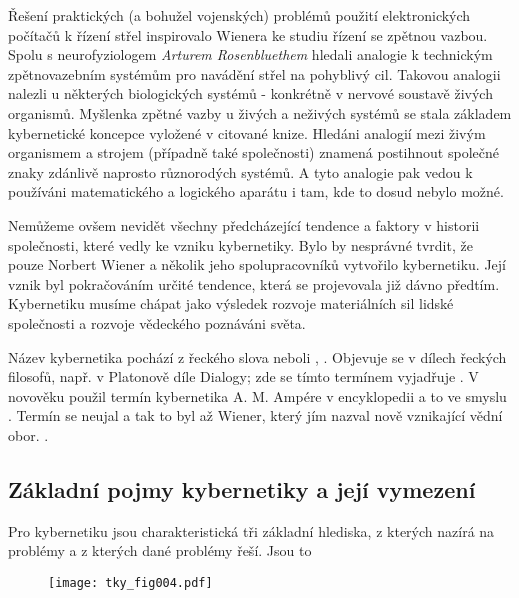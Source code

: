     Řešení praktických (a bohužel vojenských) problémů použití elektronických počítačů k řízení 
    střel inspirovalo Wienera ke studiu řízení se zpětnou vazbou. Spolu s neurofyziologem 
    \emph{Arturem Rosenbluethem} hledali analogie k technickým zpětnovazebním systémům pro navádění 
    střel na pohyblivý cil. Takovou analogii nalezli u některých biologických systémů - konkrétně v 
    nervové soustavě živých organismů. Myšlenka zpětné vazby u živých a neživých systémů se stala 
    základem kybernetické koncepce vyložené v citované knize. Hledáni analogií mezi živým 
    organismem a strojem (případně také společnosti) znamená postihnout společné znaky zdánlivě 
    naprosto různorodých systémů. A tyto analogie pak vedou k používáni matematického a logického 
    aparátu i tam, kde to dosud nebylo možné.
    
    Nemůžeme ovšem nevidět všechny předcházející tendence a faktory v historii společnosti, které 
    vedly ke vzniku kybernetiky. Bylo by nesprávné tvrdit, že pouze Norbert Wiener a několik jeho 
    spolupracovníků vytvořilo kybernetiku. Její vznik byl pokračováním určité tendence, která se 
    projevovala již dávno předtím. Kybernetiku musíme chápat jako výsledek rozvoje materiálních sil 
    lidské společnosti a rozvoje vědeckého poznáváni světa.
    
    Název kybernetika pochází z řeckého slova  neboli , . Objevuje se v dílech řeckých filosofů, např. v Platonově díle Dialogy; zde se 
    tímto termínem vyjadřuje . V 
    novověku použil termín kybernetika A. M. Ampére v encyklopedii a to ve smyslu . Termín se neujal a tak to byl až Wiener, který jím nazval nově vznikající vědní 
    obor. \cite[s.~6]{Svarc1986}.

    \subsection{Základní pojmy kybernetiky a její vymezení}
      Pro kybernetiku jsou charakteristická tři základní hlediska, z kterých nazírá na problémy a z 
      kterých dané problémy řeší. Jsou to

      \begin{figure}[ht!] %
        \centering
        \texttt{[image: tky\_fig004.pdf]}
        \caption*{ }
        \label{tky:fig004}
      \end{figure}
      
